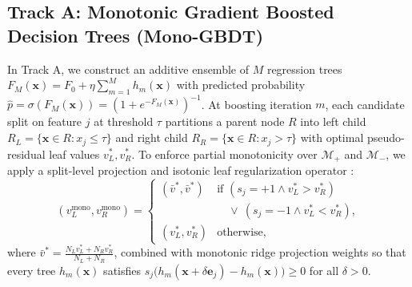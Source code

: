 \documentclass[pdflatex,sn-mathphys-num,twocolumn]{sn-jnl}
\theoremstyle{thmstyleone}
\theoremstyle{thmstyletwo}
\theoremstyle{thmstylethree}
\begin{document}
\subsection{Track A: Monotonic Gradient Boosted Decision Trees (Mono-GBDT)}
In Track A, we construct an additive ensemble of $M$ regression trees $F_M(\mathbf{x}) = F_0 + \eta \sum_{m=1}^M h_m(\mathbf{x})$ with predicted probability $\hat{p} = \sigma(F_M(\mathbf{x})) = (1 + e^{-F_M(\mathbf{x})})^{-1}$. At boosting iteration $m$, each candidate split on feature $j$ at threshold $\tau$ partitions a parent node $R$ into left child $R_L = \{\mathbf{x} \in R : x_j \le \tau\}$ and right child $R_R = \{\mathbf{x} \in R : x_j > \tau\}$ with optimal pseudo-residual leaf values $v_L^*, v_R^*$. To enforce partial monotonicity over $\mathcal{M}_+$ and $\mathcal{M}_-$, we apply a split-level projection and isotonic leaf regularization operator \citep{chen2016xgboost,ke2017lightgbm}:
\begin{equation}
    (v_L^{\text{mono}}, v_R^{\text{mono}}) = \begin{cases}
        (\bar{v}^*, \bar{v}^*) & \text{if } (s_j = +1 \wedge v_L^* > v_R^*) \\
        & \quad \vee \ (s_j = -1 \wedge v_L^* < v_R^*), \\[4pt]
        (v_L^*, v_R^*) & \text{otherwise},
    \end{cases}
\end{equation}
where $\bar{v}^* = \frac{N_L v_L^* + N_R v_R^*}{N_L + N_R}$, 
combined with monotonic ridge projection weights so that every tree $h_m(\mathbf{x})$ satisfies $s_j \big(h_m(\mathbf{x} + \delta \mathbf{e}_j) - h_m(\mathbf{x})\big) \ge 0$ for all $\delta > 0$.
\end{document}
